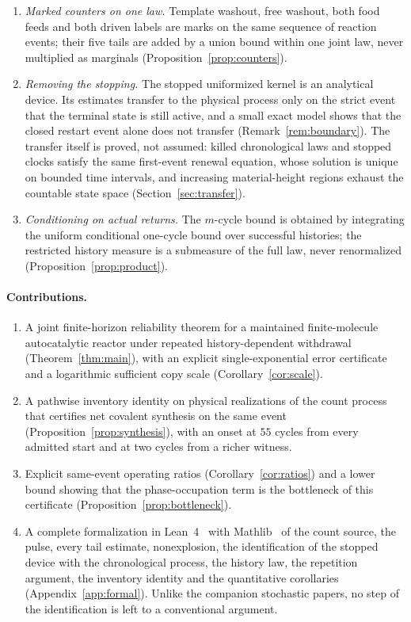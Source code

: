\documentclass[11pt,a4paper]{article}
\theoremstyle{plain}
\theoremstyle{definition}
\theoremstyle{remark}
\begin{document}
\begin{enumerate}[label=(\roman*)]
\item \emph{Marked counters on one law.} Template washout, free washout, both food feeds and both driven labels are marks on the same sequence of reaction events; their five tails are added by a union bound within one joint law, never multiplied as marginals (Proposition~\ref{prop:counters}).
\item \emph{Removing the stopping.} The stopped uniformized kernel is an analytical device. Its estimates transfer to the physical process only on the strict event that the terminal state is still active, and a small exact model shows that the closed restart event alone does not transfer (Remark~\ref{rem:boundary}). The transfer itself is proved, not assumed: killed chronological laws and stopped clocks satisfy the same first-event renewal equation, whose solution is unique on bounded time intervals, and increasing material-height regions exhaust the countable state space (Section~\ref{sec:transfer}).
\item \emph{Conditioning on actual returns.} The $m$-cycle bound is obtained by integrating the uniform conditional one-cycle bound over successful histories; the restricted history measure is a submeasure of the full law, never renormalized (Proposition~\ref{prop:product}).
\end{enumerate}

\paragraph{Contributions.}
\begin{enumerate}[label=(\alph*)]
\item A joint finite-horizon reliability theorem for a maintained finite-molecule autocatalytic reactor under repeated history-dependent withdrawal (Theorem~\ref{thm:main}), with an explicit single-exponential error certificate and a logarithmic sufficient copy scale (Corollary~\ref{cor:scale}).
\item A pathwise inventory identity on physical realizations of the count process that certifies net covalent synthesis on the same event (Proposition~\ref{prop:synthesis}), with an onset at $55$ cycles from every admitted start and at two cycles from a richer witness.
\item Explicit same-event operating ratios (Corollary~\ref{cor:ratios}) and a lower bound showing that the phase-occupation term is the bottleneck of this certificate (Proposition~\ref{prop:bottleneck}).
\item A complete formalization in Lean~4~\citep{demoura2021} with Mathlib~\citep{mathlib2020} of the count source, the pulse, every tail estimate, nonexplosion, the identification of the stopped device with the chronological process, the history law, the repetition argument, the inventory identity and the quantitative corollaries (Appendix~\ref{app:formal}). Unlike the companion stochastic papers, no step of the identification is left to a conventional argument.
\end{enumerate}
\end{document}

